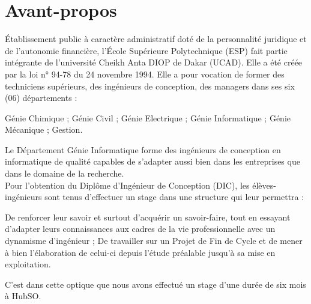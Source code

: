 %
%
%
%
%
%
\chapter*{Avant-propos}
\begin{SingleSpace}

Établissement public à caractère administratif doté de la personnalité juridique et de l’autonomie financière, l’École Supérieure Polytechnique (ESP) fait partie intégrante de l’université Cheikh Anta DIOP de Dakar (UCAD). Elle a été créée par la loi n° 94-78 du 24 novembre 1994. Elle a pour vocation de former des techniciens supérieurs, des ingénieurs de conception, des managers dans ses six (06) départements : 
\begin{itemize}
	\itemcheck Génie Chimique ; 
	\itemcheck Génie Civil ;
	\itemcheck Génie Electrique ;
	\itemcheck Génie Informatique ; 
	\itemcheck Génie Mécanique ;
	\itemcheck Gestion.
\end{itemize}
Le Département Génie Informatique forme des ingénieurs de conception en informatique de qualité capables de s’adapter aussi bien dans les entreprises que dans le domaine de la recherche.\\
Pour l’obtention du Diplôme d’Ingénieur de Conception (DIC), les élèves-ingénieurs sont tenus d’effectuer un stage dans une structure qui leur permettra :
\begin{itemize}
	\itemcheck De renforcer leur savoir et surtout d’acquérir un savoir-faire, tout en essayant d’adapter leurs connaissances aux cadres de la vie professionnelle avec un dynamisme d’ingénieur ;
	\itemcheck De travailler sur un Projet de Fin de Cycle et de mener à bien l’élaboration de celui-ci depuis l’étude préalable jusqu'à sa mise en exploitation.
\end{itemize}
C’est dans cette optique que nous avons effectué un stage d'une durée de six mois à HubSO.

\end{SingleSpace}
